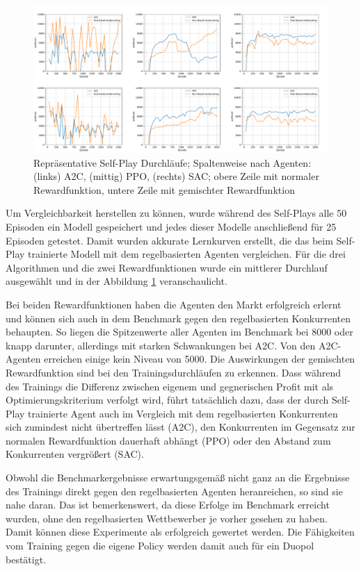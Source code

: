 \begin{figure}[htb]
	\centering
	\includegraphics[width=\textwidth]{main/self_play_detailed.pdf}
	\caption{Repräsentative Self-Play Durchläufe; Spaltenweise nach Agenten: (links) A2C, (mittig) PPO, (rechts) SAC; obere Zeile mit normaler Rewardfunktion, untere Zeile mit gemischter Rewardfunktion}
	\label{graphic:SelfPlayDetails}
\end{figure}
Um Vergleichbarkeit herstellen zu können, wurde während des Self-Plays alle 50 Episoden ein Modell gespeichert und jedes dieser Modelle anschließend für 25 Episoden getestet.
Damit wurden akkurate Lernkurven erstellt, die das beim Self-Play trainierte Modell mit dem regelbasierten Agenten vergleichen.
Für die drei Algorithmen und die zwei Rewardfunktionen wurde ein mittlerer Durchlauf ausgewählt und in der Abbildung \ref{graphic:SelfPlayDetails} veranschaulicht.

Bei beiden Rewardfunktionen haben die Agenten den Markt erfolgreich erlernt und können sich auch in dem Benchmark gegen den regelbasierten Konkurrenten behaupten.
So liegen die Spitzenwerte aller Agenten im Benchmark bei 8000 oder knapp darunter, allerdings mit starken Schwankungen bei A2C.
Von den A2C-Agenten erreichen einige kein Niveau von 5000.
Die Auswirkungen der gemischten Rewardfunktion sind bei den Trainingsdurchläufen zu erkennen.
Dass während des Trainings die Differenz zwischen eigenem und gegnerischen Profit mit als Optimierungskriterium verfolgt wird, führt tatsächlich dazu, dass der durch Self-Play trainierte Agent auch im Vergleich mit dem regelbasierten Konkurrenten sich zumindest nicht übertreffen lässt (A2C), den Konkurrenten im Gegensatz zur normalen Rewardfunktion dauerhaft abhängt (PPO) oder den Abstand zum Konkurrenten vergrößert (SAC).

Obwohl die Benchmarkergebnisse erwartungsgemäß nicht ganz an die Ergebnisse des Trainings direkt gegen den regelbasierten Agenten heranreichen, so sind sie nahe daran.
Das ist bemerkenswert, da diese Erfolge im Benchmark erreicht wurden, ohne den regelbasierten Wettbewerber je vorher gesehen zu haben.
Damit können diese Experimente als erfolgreich gewertet werden.
Die Fähigkeiten vom Training gegen die eigene Policy werden damit auch für ein Duopol bestätigt.

